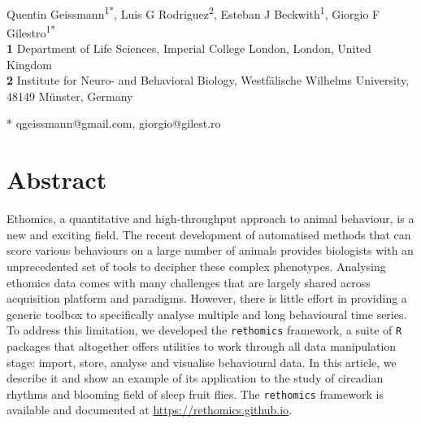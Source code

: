 \documentclass[10pt,letterpaper]{article}\usepackage[]{graphicx}\usepackage[]{color}
\date{}
\begin{document}
\vspace*{0.2in}

\begin{flushleft}
{\Large
\textbf{} 
}
\newline
\\
Quentin Geissmann\textsuperscript{1*},
Luis G Rodriguez\textsuperscript{2},
Esteban J Beckwith\textsuperscript{1},
Giorgio F Gilestro\textsuperscript{1*}
\\
\bigskip
\textbf{1} Department of Life Sciences, Imperial College London, London, United Kingdom
\\
\textbf{2} Institute for Neuro- and Behavioral Biology, Westf{\"a}lische Wilhelms University, 48149 M{\"u}nster, Germany
\\
\bigskip


* qgeissmann@gmail.com, giorgio@gilest.ro

\end{flushleft}
\section*{Abstract}
Ethomics, a quantitative and high-throughput approach to animal behaviour, is a new and exciting field.
The recent development of automatised methods that can score various behaviours on a large number of animals
provides biologists with an unprecedented set of tools to decipher these complex phenotypes. 
Analysing ethomics data comes with many challenges that are largely shared across acquisition platform and paradigms.
However, there is little effort in providing a generic toolbox to specifically analyse multiple and long behavioural time series.
To address this limitation, we developed the \texttt{rethomics} framework, 
a suite of \texttt{R} packages that altogether offers utilities to work through all data manipulation stage:
import, store, analyse and visualise behavioural data.
In this article, we describe it and show an example of its application to the study of circadian rhythms and blooming field of sleep fruit flies.
The \texttt{rethomics} framework is available and documented at \href{https://rethomics.github.io}{https://rethomics.github.io}.
\end{document}

